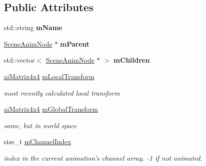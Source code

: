 \subsection*{Public Attributes}
\begin{DoxyCompactItemize}
\item 
\hypertarget{struct_assimp_view_1_1_scene_anim_node_ae32b0895707d54ee1b892388e8a58927}{std\+::string {\bfseries m\+Name}}\label{struct_assimp_view_1_1_scene_anim_node_ae32b0895707d54ee1b892388e8a58927}

\item 
\hypertarget{struct_assimp_view_1_1_scene_anim_node_a0dfb00f9c2053f5bded41ba137615669}{\hyperlink{struct_assimp_view_1_1_scene_anim_node}{Scene\+Anim\+Node} $\ast$ {\bfseries m\+Parent}}\label{struct_assimp_view_1_1_scene_anim_node_a0dfb00f9c2053f5bded41ba137615669}

\item 
\hypertarget{struct_assimp_view_1_1_scene_anim_node_a16a3dbca089357e5c15283fa74e43381}{std\+::vector$<$ \hyperlink{struct_assimp_view_1_1_scene_anim_node}{Scene\+Anim\+Node} $\ast$ $>$ {\bfseries m\+Children}}\label{struct_assimp_view_1_1_scene_anim_node_a16a3dbca089357e5c15283fa74e43381}

\item 
\hypertarget{struct_assimp_view_1_1_scene_anim_node_a23bb1a07baecee074e524d97efa87849}{\hyperlink{structai_matrix4x4}{ai\+Matrix4x4} \hyperlink{struct_assimp_view_1_1_scene_anim_node_a23bb1a07baecee074e524d97efa87849}{m\+Local\+Transform}}\label{struct_assimp_view_1_1_scene_anim_node_a23bb1a07baecee074e524d97efa87849}

\begin{DoxyCompactList}\small\item\em most recently calculated local transform \end{DoxyCompactList}\item 
\hypertarget{struct_assimp_view_1_1_scene_anim_node_ad1c1134f872223cf86328611144ec07a}{\hyperlink{structai_matrix4x4}{ai\+Matrix4x4} \hyperlink{struct_assimp_view_1_1_scene_anim_node_ad1c1134f872223cf86328611144ec07a}{m\+Global\+Transform}}\label{struct_assimp_view_1_1_scene_anim_node_ad1c1134f872223cf86328611144ec07a}

\begin{DoxyCompactList}\small\item\em same, but in world space \end{DoxyCompactList}\item 
\hypertarget{struct_assimp_view_1_1_scene_anim_node_a5820747acefb02b77e781d8e7526521c}{size\+\_\+t \hyperlink{struct_assimp_view_1_1_scene_anim_node_a5820747acefb02b77e781d8e7526521c}{m\+Channel\+Index}}\label{struct_assimp_view_1_1_scene_anim_node_a5820747acefb02b77e781d8e7526521c}

\begin{DoxyCompactList}\small\item\em index in the current animation's channel array. -\/1 if not animated. \end{DoxyCompactList}\end{DoxyCompactItemize}


